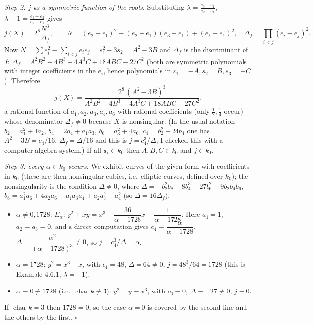 \documentclass[11pt]{article}
\begin{document}
\emph{Step 2: $j$ as a symmetric function of the roots.} Substituting $\lambda=\frac{e_3-e_1}{e_2-e_1}$, $\lambda-1=\frac{e_3-e_2}{e_2-e_1}$ gives
\[ j(X)=2^8\frac{N^3}{\Delta_f},\qquad N=(e_2-e_1)^2-(e_2-e_1)(e_3-e_1)+(e_3-e_1)^2,\quad \Delta_f=\prod_{i<j}(e_i-e_j)^2 . \]
Now $N=\sum e_i^2-\sum_{i<j}e_ie_j=s_1^2-3s_2=A^2-3B$ and $\Delta_f$ is the discriminant of $f$: $\Delta_f=A^2B^2-4B^3-4A^3C+18ABC-27C^2$ (both are symmetric polynomials with integer coefficients in the $e_i$, hence polynomials in $s_1=-A,s_2=B,s_3=-C$). Therefore
\[ j(X)=\frac{2^8\,(A^2-3B)^3}{A^2B^2-4B^3-4A^3C+18ABC-27C^2}, \]
a rational function of $a_1,a_2,a_3,a_4,a_6$ with rational coefficients (only $\tfrac12,\tfrac14$ occur), whose denominator $\Delta_f\ne0$ because $X$ is nonsingular. (In the usual notation $b_2=a_1^2+4a_2$, $b_4=2a_4+a_1a_3$, $b_6=a_3^2+4a_6$, $c_4=b_2^2-24b_4$ one has $A^2-3B=c_4/16$, $\Delta_f=\Delta/16$ and this is $j=c_4^3/\Delta$; I checked this with a computer algebra system.) If all $a_i\in k_0$ then $A,B,C\in k_0$ and $j\in k_0$.

\emph{Step 3: every $\alpha\in k_0$ occurs.} We exhibit curves of the given form with coefficients in $k_0$ (these are then nonsingular cubics, i.e.\ elliptic curves, defined over $k_0$); the nonsingularity is the condition $\Delta\ne0$, where $\Delta=-b_2^2b_8-8b_4^3-27b_6^2+9b_2b_4b_6$, $b_8=a_1^2a_6+4a_2a_6-a_1a_3a_4+a_2a_3^2-a_4^2$ (so $\Delta=16\Delta_f$).
\begin{itemize}
\item $\alpha\ne0,1728$: $E_\alpha:\ y^2+xy=x^3-\dfrac{36}{\alpha-1728}x-\dfrac{1}{\alpha-1728}$. Here $a_1=1$, $a_2=a_3=0$, and a direct computation gives $c_4=\dfrac{\alpha}{\alpha-1728}$, $\Delta=\dfrac{\alpha^2}{(\alpha-1728)^3}\ne0$, so $j=c_4^3/\Delta=\alpha$.
\item $\alpha=1728$: $y^2=x^3-x$, with $c_4=48$, $\Delta=64\ne0$, $j=48^3/64=1728$ (this is Example 4.6.1; $\lambda=-1$).
\item $\alpha=0\ne1728$ (i.e.\ $\operatorname{char}k\ne3$): $y^2+y=x^3$, with $c_4=0$, $\Delta=-27\ne0$, $j=0$.
\end{itemize}
If $\operatorname{char}k=3$ then $1728=0$, so the case $\alpha=0$ is covered by the second line and the others by the first. \hfill$\square$
\end{document}
